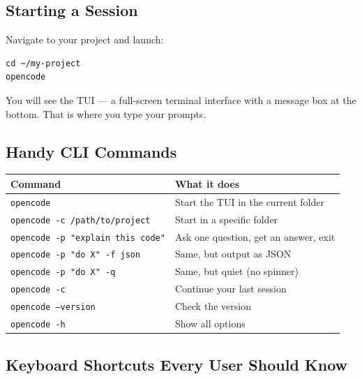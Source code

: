 \documentclass[11pt]{article}
\begin{document}
\subsection{Starting a Session}

Navigate to your project and launch:

\begin{lstlisting}[style=term]
cd ~/my-project
opencode
\end{lstlisting}

You will see the TUI --- a full-screen terminal interface with a message box at the bottom.  That is where you type your prompts.

\subsection{Handy CLI Commands}

\begin{center}
\begin{tabular}{ll}
\toprule
\textbf{Command} & \textbf{What it does} \\
\midrule
\texttt{opencode}                        & Start the TUI in the current folder \\
\texttt{opencode -c /path/to/project}    & Start in a specific folder \\
\texttt{opencode -p "explain this code"} & Ask one question, get an answer, exit \\
\texttt{opencode -p "do X" -f json}     & Same, but output as JSON \\
\texttt{opencode -p "do X" -q}           & Same, but quiet (no spinner) \\
\texttt{opencode -c}                     & Continue your last session \\
\texttt{opencode --version}              & Check the version \\
\texttt{opencode -h}                     & Show all options \\
\bottomrule
\end{tabular}
\end{center}

\subsection{Keyboard Shortcuts Every User Should Know}
\end{document}
